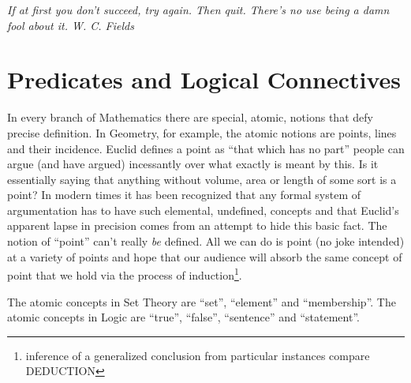 \documentclass[10pt,]{book}
\theoremstyle{plain}
\theoremstyle{definition}
\theoremstyle{definition}
\numberwithin{equation}{section}
\begin{document}
      \emph{If at first you don't succeed, try again. Then quit. There's no use being a damn fool about it. \textendash{}W. C. Fields}
\typeout{************************************************}
\typeout{************************************************}
\section[{Predicates and Logical Connectives}]{Predicates and Logical Connectives}\label{sec_pred}

    In every branch of Mathematics there are special, 
    atomic, notions that
    defy precise definition. In Geometry, for example, the atomic notions
    are points, lines and their incidence. Euclid defines a point as
    ``that which has no part'' \textemdash{} people can argue (and have argued) incessantly
    over what exactly is meant by this. Is it essentially saying that anything
    without volume, area or length of some sort is a point? In modern times
    it has been recognized that any formal system of argumentation has to
    have such elemental, undefined, concepts \textemdash{} and that Euclid's apparent
    lapse in precision comes from an attempt to hide this basic fact.
    The notion of ``point'' can't really \emph{be} defined. All we can do
    is point (no joke intended) at a variety of points and hope that our
    audience will absorb the same concept of point that we hold via the
    process of induction\footnote{inference of a 
    generalized conclusion from particular instances \textemdash{} compare DEDUCTION\label{fn-9}}.
\par

    The atomic concepts in Set Theory are ``set'', ``element'' and ``membership''.
    The atomic concepts in Logic are ``true'', ``false'', 
    ``sentence'' and  ``statement''.
\par
\end{document}
